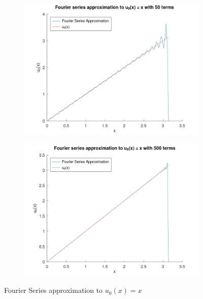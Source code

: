 \begin{solution}
    \begin{figure}[h]
        \centering
        \begin{subfigure}[b]{0.475\textwidth}
            \centering
            \includegraphics[width=\textwidth]{problem1_fourier_series_solution_50_terms.png}
            \label{fig:problem1_50terms}
        \end{subfigure}
        \hfill
        \begin{subfigure}[b]{0.475\textwidth}
            \centering
            \includegraphics[width=\textwidth]{problem1_fourier_series_solution_500_terms.png}
            \label{fig:problem1_500terms}
        \end{subfigure}
        \caption[Fourier Series solution]
        {\small Fourier Series approximation to $u_0(x) = x$} 
        \label{fig:fouriersoln}
    \end{figure}

    \pagebreak

    
\end{solution}